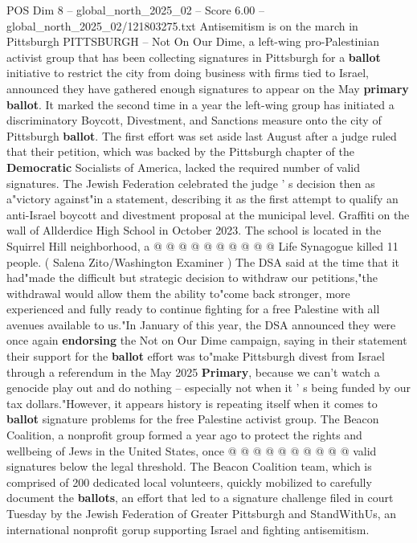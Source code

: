 \begin{textsample}{POS Dim 8 – global\_north\_2025\_02 – Score 6.00 – global\_north\_2025\_02/121803275.txt}  \label{ex:f8_pos_315}
Antisemitism is on the march in Pittsburgh PITTSBURGH -- Not On Our Dime, a left-wing pro-Palestinian activist group that has been collecting signatures in Pittsburgh for a \textbf{ballot} initiative to restrict the city from doing business with firms tied to Israel, announced they have gathered enough signatures to appear on the May \textbf{primary} \textbf{ballot}.
It marked the second time in a year the left-wing group has initiated a discriminatory Boycott, Divestment, and Sanctions measure onto the city of Pittsburgh \textbf{ballot}.
The first effort was set aside last August after a judge ruled that their petition, which was backed by the Pittsburgh chapter of the \textbf{Democratic} Socialists of America, lacked the required number of valid signatures.
The Jewish Federation celebrated the judge ' s decision then as a"victory against"in a statement, describing it as the first attempt to qualify an anti-Israel boycott and divestment proposal at the municipal level.
Graffiti on the wall of Allderdice High School in October 2023.
The school is located in the Squirrel Hill neighborhood, a @ @ @ @ @ @ @ @ @ @ Life Synagogue killed 11 people. ( Salena Zito/Washington Examiner ) The DSA said at the time that it had"made the difficult but strategic decision to withdraw our petitions,"the withdrawal would allow them the ability to"come back stronger, more experienced and fully ready to continue fighting for a free Palestine with all avenues available to us."In January of this year, the DSA announced they were once again \textbf{endorsing} the Not on Our Dime campaign, saying in their statement their support for the \textbf{ballot} effort was to"make Pittsburgh divest from Israel through a referendum in the May 2025 \textbf{Primary}, because we can't watch a genocide play out and do nothing -- especially not when it ' s being funded by our tax dollars."However, it appears history is repeating itself when it comes to \textbf{ballot} signature problems for the free Palestine activist group.
The Beacon Coalition, a nonprofit group formed a year ago to protect the rights and wellbeing of Jews in the United States, once @ @ @ @ @ @ @ @ @ @ valid signatures below the legal threshold.
The Beacon Coalition team, which is comprised of 200 dedicated local volunteers, quickly mobilized to carefully document the \textbf{ballots}, an effort that led to a signature challenge filed in court Tuesday by the Jewish Federation of Greater Pittsburgh and StandWithUs, an international nonprofit gorup supporting Israel and fighting antisemitism.

\end{textsample}
